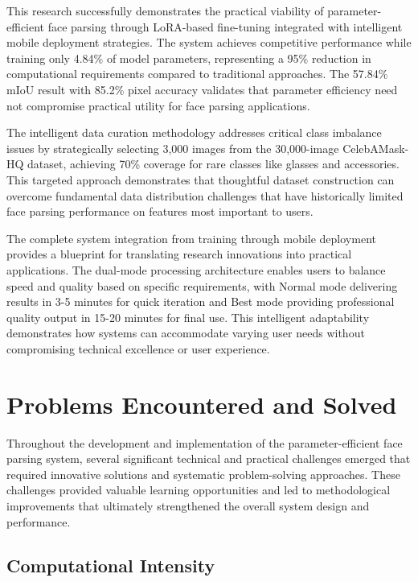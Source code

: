 \documentclass[12pt,a4paper]{report}
\begin{document}
This research successfully demonstrates the practical viability of parameter-efficient face parsing through LoRA-based fine-tuning integrated with intelligent mobile deployment strategies. The system achieves competitive performance while training only 4.84\% of model parameters, representing a 95\% reduction in computational requirements compared to traditional approaches. The 57.84\% mIoU result with 85.2\% pixel accuracy validates that parameter efficiency need not compromise practical utility for face parsing applications.

The intelligent data curation methodology addresses critical class imbalance issues by strategically selecting 3,000 images from the 30,000-image CelebAMask-HQ dataset, achieving 70\% coverage for rare classes like glasses and accessories. This targeted approach demonstrates that thoughtful dataset construction can overcome fundamental data distribution challenges that have historically limited face parsing performance on features most important to users.

The complete system integration from training through mobile deployment provides a blueprint for translating research innovations into practical applications. The dual-mode processing architecture enables users to balance speed and quality based on specific requirements, with Normal mode delivering results in 3-5 minutes for quick iteration and Best mode providing professional quality output in 15-20 minutes for final use. This intelligent adaptability demonstrates how systems can accommodate varying user needs without compromising technical excellence or user experience.

\section{Problems Encountered and Solved}

Throughout the development and implementation of the parameter-efficient face parsing system, several significant technical and practical challenges emerged that required innovative solutions and systematic problem-solving approaches. These challenges provided valuable learning opportunities and led to methodological improvements that ultimately strengthened the overall system design and performance.

\subsection{Computational Intensity}
\end{document}
